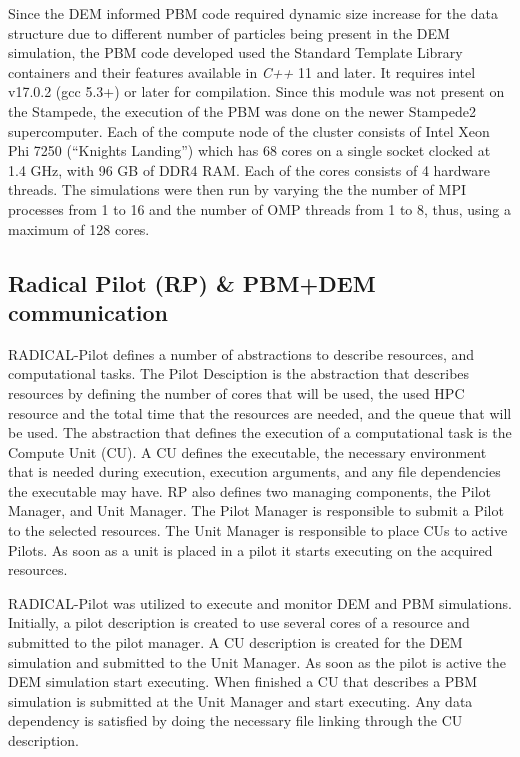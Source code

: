 \documentclass[preprint,11pt,authoryear]{elsarticle}
\begin{document}
Since the DEM informed PBM code required dynamic size increase for the data structure due to different number of particles being 
present in the DEM simulation,
the PBM code developed used the Standard Template Library containers and their features available in \textit{C++} 11 
and later. It requires intel v17.0.2 (gcc 5.3+)  or later for compilation. Since this module was not present on the 
Stampede, the execution of the PBM was done on the newer Stampede2 supercomputer. Each of the compute node of the 
cluster consists of Intel Xeon Phi 7250 (\textquotedblleft Knights Landing\textquotedblright) which has 68 cores on 
a single socket clocked at 1.4 GHz, with 96 GB of DDR4 RAM. Each of the cores consists of 4 hardware threads. 
The simulations were then run by varying the the number of MPI processes from 1 to 16 and the number of OMP threads 
from 1 to 8, thus, using a maximum of 128 cores.

\subsection{Radical Pilot (RP) \& PBM+DEM communication}
\label{sec:RPandCommunications}
RADICAL-Pilot defines a number of abstractions to describe resources, and computational 
tasks. The Pilot Desciption is the abstraction that describes resources by defining the 
number of cores that will be used, the used HPC resource and the total time that the 
resources are needed, and the queue that will be used. The abstraction that defines the 
execution of a computational task is the Compute Unit (CU). A CU defines the executable, 
the necessary environment that is needed during execution, execution arguments, and any 
file dependencies the executable may have. RP also defines two managing components, the
Pilot Manager, and Unit Manager. The Pilot Manager is responsible to submit a Pilot to the
selected resources. The Unit Manager is responsible to place CUs to active Pilots. As soon as
a unit is placed in a pilot it starts executing on the acquired resources.

RADICAL-Pilot was utilized to execute and monitor DEM and PBM simulations. Initially, a pilot
description is created to use several cores of a resource and submitted to the pilot manager. A
CU description is created for the DEM simulation and submitted to the Unit Manager. As soon as the
pilot is active the DEM simulation start executing. When finished a CU that describes a PBM 
simulation is submitted at the Unit Manager and start executing. Any data dependency is satisfied 
by doing the necessary file linking through the CU description.
\end{document}
